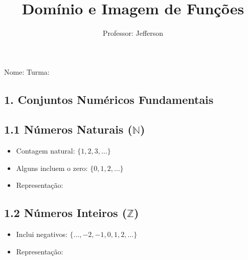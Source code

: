 \documentclass[11pt]{article}
\title{\textcolor{titleblue}{Domínio e Imagem de Funções}}
\author{Professor: Jefferson}
\date{}
\begin{document}
\maketitle
\vspace{-1cm}

\begin{center}
\large{Nome: \underline{\hspace{8cm}} \quad Turma: \underline{\hspace{3cm}}}
\end{center}

\begin{multicols}{2}

\section*{1. Conjuntos Numéricos Fundamentais}

\subsection*{1.1 Números Naturais ($\mathbb{N}$)}
\begin{itemize}
    \item Contagem natural: $\{1, 2, 3, \dots\}$
    \item Alguns incluem o zero: $\{0, 1, 2, \dots\}$
    \item Representação:
    \begin{center}
    \end{center}
\end{itemize}

\subsection*{1.2 Números Inteiros ($\mathbb{Z}$)}
\begin{itemize}
    \item Inclui negativos: $\{\dots, -2, -1, 0, 1, 2, \dots\}$
    \item Representação:
    \begin{center}
    \end{center}
\end{itemize}


\end{multicols}
\end{document}
